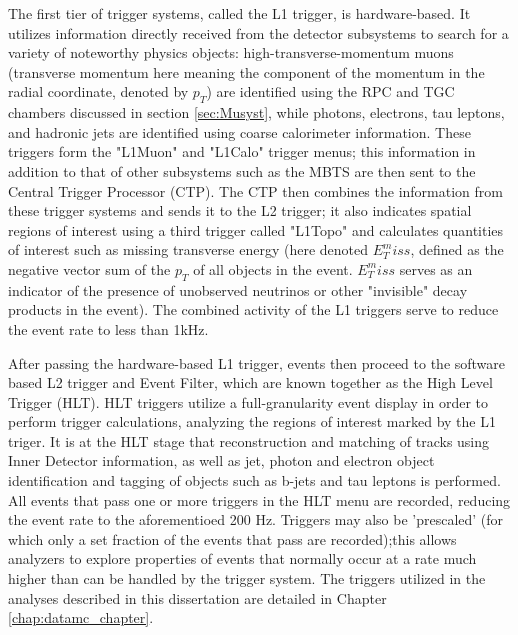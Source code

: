 The first tier of trigger systems, called the L1 trigger, is hardware-based. It utilizes information directly received from the detector subsystems to search for a variety of noteworthy physics objects: high-transverse-momentum muons (transverse momentum here meaning the component of the momentum in the radial coordinate, denoted by $p_T$) are identified using the RPC and TGC chambers discussed in section \ref{sec:Musyst}, while photons, electrons, tau leptons, and hadronic jets are identified using coarse calorimeter information. These triggers form the "L1Muon" and "L1Calo" trigger menus; this information in addition to that of other subsystems such as the MBTS are then sent to the Central Trigger Processor (CTP). The CTP then combines the information from these trigger systems and sends it to the L2 trigger; it also indicates spatial regions of interest using a third trigger called "L1Topo" and calculates quantities of interest such as missing transverse energy (here denoted $E_T^miss$, defined as the negative vector sum of the $p_T$ of all objects in the event. $E_T^miss$ serves as an indicator of the presence of unobserved neutrinos or other "invisible" decay products in the event). The combined activity of the L1 triggers serve to reduce the event rate to less than 1kHz.

After passing the hardware-based L1 trigger, events then proceed to the software based L2 trigger and Event Filter, which are known together as the High Level Trigger (HLT). HLT triggers utilize a full-granularity event display in order to perform trigger calculations, analyzing the regions of interest marked by the L1 triger. It is at the HLT stage that reconstruction and matching of tracks using Inner Detector information, as well as jet, photon and electron object identification and tagging of objects such as b-jets and tau leptons is performed. All events that pass one or more triggers in the HLT menu are recorded, reducing the event rate to the aforementioed 200 Hz. Triggers may also be 'prescaled' (for which only a set fraction of the events that pass are recorded);this allows analyzers to explore properties of events that normally occur at a rate much higher than can be handled by the trigger system. The triggers utilized in the analyses described in this dissertation are detailed in Chapter \ref{chap:datamc_chapter}.

